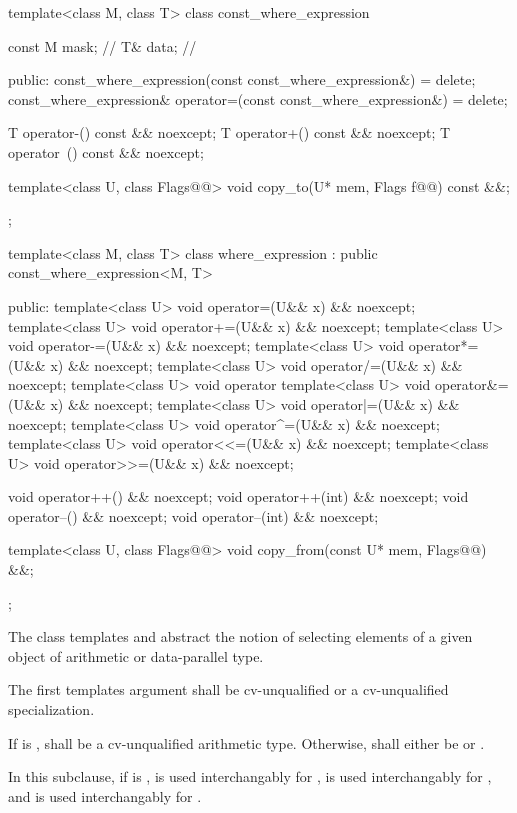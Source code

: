 \begin{codeblock}
template<class M, class T> class const_where_expression {
  const M mask;    // \expos
  T& data;         // \expos

public:
  const_where_expression(const const_where_expression&) = delete;
  const_where_expression& operator=(const const_where_expression&) = delete;

  T operator-() const && noexcept;
  T operator+() const && noexcept;
  T operator~() const && noexcept;

  template<class U, class Flags@@> void copy_to(U* mem, Flags f@\wgAdd{ = \{\}}@) const &&;
};

template<class M, class T>
class where_expression : public const_where_expression<M, T> {
public:
  template<class U> void operator=(U&& x) && noexcept;
  template<class U> void operator+=(U&& x) && noexcept;
  template<class U> void operator-=(U&& x) && noexcept;
  template<class U> void operator*=(U&& x) && noexcept;
  template<class U> void operator/=(U&& x) && noexcept;
  template<class U> void operator%
  template<class U> void operator&=(U&& x) && noexcept;
  template<class U> void operator|=(U&& x) && noexcept;
  template<class U> void operator^=(U&& x) && noexcept;
  template<class U> void operator<<=(U&& x) && noexcept;
  template<class U> void operator>>=(U&& x) && noexcept;

  void operator++() && noexcept;
  void operator++(int) && noexcept;
  void operator--() && noexcept;
  void operator--(int) && noexcept;

  template<class U, class Flags@@> void copy_from(const U* mem, Flags@\wgAdd{ = \{\}}@) &&;
};
\end{codeblock}

\pnum
The class templates  and  abstract the notion of selecting elements of a given object of arithmetic or data-parallel type.

\pnum
The first templates argument  shall be cv-unqualified  or a cv-unqualified  specialization.

\pnum
If  is ,  shall be a cv-unqualified arithmetic type. Otherwise,  shall either be  or .

\pnum
In this subclause, if  is ,  is used interchangably for ,  is used interchangably for , and  is used interchangably for .

